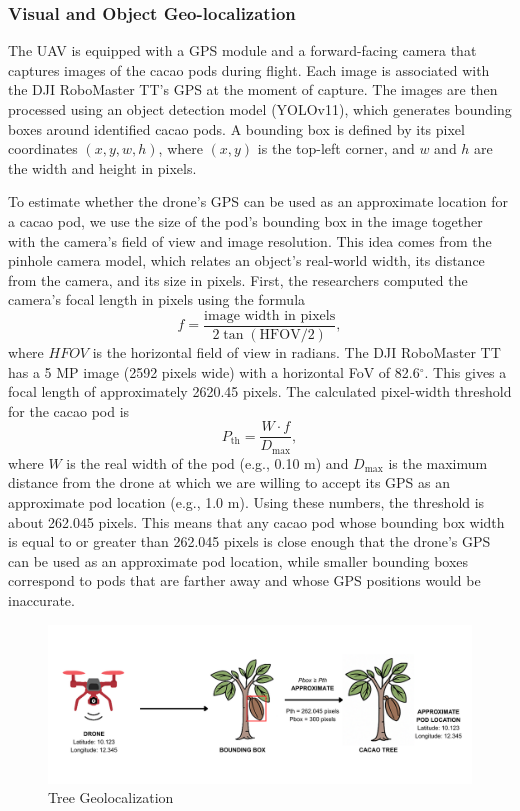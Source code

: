 \subsubsection*{Visual and Object Geo-localization}

The UAV is equipped with a GPS module and a forward-facing camera that captures images of the cacao pods during flight. Each image is associated with the DJI RoboMaster TT’s GPS at the moment of capture. The images are then processed using an object detection model (YOLOv11), which generates bounding boxes around identified cacao pods. A bounding box is defined by its pixel coordinates $(x, y, w, h)$, where $(x, y)$ is the top-left corner, and $w$ and $h$ are the width and height in pixels.

To estimate whether the drone's GPS can be used as an approximate location for a cacao pod, we use the size of the pod's bounding box in the image together with the camera's field of view and image resolution. This idea comes from the pinhole camera model, which relates an object's real-world width, its distance from the camera, and its size in pixels. First, the researchers computed the camera's focal length in pixels using the formula
\[
f = \frac{\text{image width in pixels}}{2\tan(\text{HFOV}/2)},
\]
where $HFOV$ is the horizontal field of view in radians. The DJI RoboMaster TT has a 5 MP image (2592 pixels wide) with a horizontal FoV of 82.6$^\circ$. This gives a focal length of approximately 2620.45 pixels. The calculated pixel-width threshold for the cacao pod is
\[
P_{\text{th}} = \frac{W \cdot f}{D_{\max}},
\]
where $W$ is the real width of the pod (e.g., 0.10 m) and $D_{\max}$ is the maximum distance from the drone at which we are willing to accept its GPS as an approximate pod location (e.g., 1.0 m). Using these numbers, the threshold is about 262.045 pixels. This means that any cacao pod whose bounding box width is equal to or greater than 262.045 pixels is close enough that the drone's GPS can be used as an approximate pod location, while smaller bounding boxes correspond to pods that are farther away and whose GPS positions would be inaccurate.

\begin{figure}[H]
	\centering
	\caption{Tree Geolocalization}
	\label{fig:tree}
	\includegraphics[width=1\textwidth]{figures/Tree Geolocalization.pdf}
\end{figure}

